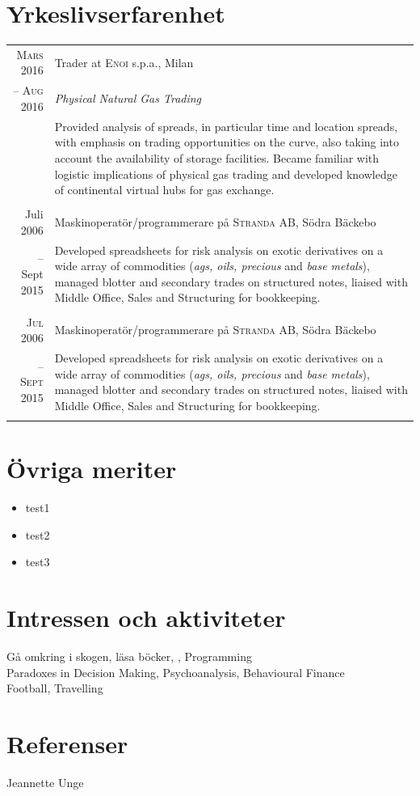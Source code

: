 \documentclass[11pt,a4paper]{article}
\begin{document}
\section{Yrkeslivserfarenhet}
\begin{tabularx}{\textwidth}{r|X}
	\textsc{Mars 2016} & Trader at \textsc{Enoi} s.p.a., Milan \\
	\textsc{-- Aug 2016}&\emph{Physical Natural Gas Trading}\\
	&\footnotesize{Provided analysis of spreads, in particular time and location spreads, with emphasis on trading opportunities on the curve, also taking into account the availability of storage facilities. Became familiar with logistic implications of physical gas trading and developed knowledge of continental virtual hubs for gas exchange.}\\
	\multicolumn{2}{c}{} \\
	
	Juli 2006 & Maskinoperatör/programmerare på \textsc{Stranda AB}, Södra Bäckebo \\
	-- Sept 2015&\footnotesize{Developed spreadsheets for risk analysis on exotic derivatives on a wide array of commodities (\textit{ags, oils, precious} and \textit{base metals}), managed blotter and secondary trades on structured notes, liaised with Middle Office, Sales and Structuring for bookkeeping.}\\
	\multicolumn{2}{c}{} \\

	\textsc{Jul 2006} & Maskinoperatör/programmerare på \textsc{Stranda AB}, Södra Bäckebo \\
	-- \textsc{Sept 2015}&\footnotesize{Developed spreadsheets for risk analysis on exotic derivatives on a wide array of commodities (\textit{ags, oils, precious} and \textit{base metals}), managed blotter and secondary trades on structured notes, liaised with Middle Office, Sales and Structuring for bookkeeping.}\\
\multicolumn{2}{c}{} \\
\end{tabularx}

\section{Övriga meriter}
\begin{itemize}
	\item test1
	\item test2
	\item test3
\end{itemize}

\section{Intressen och aktiviteter}
Gå omkring i skogen, läsa böcker, , Programming\\
Paradoxes in Decision Making, Psychoanalysis, Behavioural Finance\\
Football, Travelling

\section{Referenser}
Jeannette Unge
\end{document}
